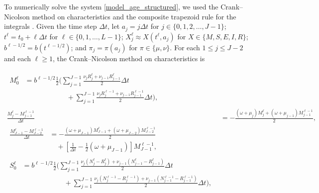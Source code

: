 \documentclass{jpmarticle}
\let\subequationsorig\subequations%
\let\endsubequationsorig\endsubequations%
\renewenvironment{subequations}{
  \subequationsorig
  \renewcommand{\theequation}{\theparentequation.\arabic{equation}}
}{
  \endsubequationsorig
}
\begin{document}
To numerically solve the system \eqref{model_age_structured}, we used
the Crank--Nicolson method on characteristics and the composite
trapezoid rule for the integrals \autocite{milner_1992}.  Given the
time step $\Delta t$, let
$a_j = j \Delta t$ for $j \in \{0, 1, 2, \ldots, J - 1\}$;
$t^{\ell} = t_0 + \ell \Delta t$ for $\ell \in \{0, 1, \ldots, L - 1\}$;
$X_j^{\ell} \approx X(t^{\ell}, a_j)$ for $X \in \{M, S, E, I, R\}$;
$b^{\ell - 1 / 2} = b(t^{\ell - 1 / 2})$; and
$\pi_j = \pi(a_j)$ for $\pi \in \{\mu, \nu\}$.
For each $1 \leq j \leq J - 2$ and each $\ell \geq 1$, the
Crank--Nicolson method on characteristics is
\begin{subequations}
  \begin{align}
    \begin{split}
      M_0^{\ell} &=
      b^{\ell - 1 / 2}
      \frac{1}{2}
      \Bigg(
      \sum_{j = 1}^{J - 1}
      \frac{\nu_j R_j^{\ell} + \nu_{j - 1} R_{j - 1}^{\ell}}{2}
      \Delta t
      \\ & \quad\quad\quad\quad\quad\quad {}
      + \sum_{j = 1}^{J - 1}
      \frac{\nu_j R_j^{\ell - 1} + \nu_{j - 1} R_{j - 1}^{\ell - 1}}{2}
      \Delta t
      \Bigg),
    \end{split}
    \\
    \frac{M_j^{\ell} - M_{j - 1}^{\ell - 1}}{\Delta t} &=
    - \frac{(\omega + \mu_j) M_j^{\ell}
      + (\omega + \mu_{j - 1}) M_{j - 1}^{\ell - 1}}{2},
    \\
    \begin{split}
      \frac{M_{J - 1}^{\ell} - M_{J - 2}^{\ell - 1}}{\Delta t} &=
      - \frac{(\omega + \mu_{J - 1}) M_{J - 1}^{\ell}
        + (\omega + \mu_{J - 2}) M_{J - 2}^{\ell - 1}}{2}
      \\ & \quad {}
      + \left[\frac{1}{\Delta t}
        - \frac{1}{2} (\omega + \mu_{J - 1})\right]
      M_{J - 1}^{\ell - 1},
    \end{split}
    \\
    \begin{split}
      S_0^{\ell} &=
      b^{\ell - 1 / 2}
      \frac{1}{2}
      \Bigg(
      \sum_{j = 1}^{J - 1}
      \frac{\nu_j (N_j^{\ell} - R_j^{\ell})
        + \nu_{j - 1} (N_{j - 1}^{\ell} - R_{j - 1}^{\ell})}
      {2}
      \Delta t
      \\ & \quad\quad\quad\quad\quad\quad {}
      + \sum_{j = 1}^{J - 1}
      \frac{\nu_j (N_j^{\ell - 1} - R_j^{\ell - 1})
        + \nu_{j - 1} (N_{j - 1}^{\ell - 1} - R_{j - 1}^{\ell - 1})}
      {2}
      \Delta t
      \Bigg),
    \end{split}

\end{align}
\end{subequations}
\end{document}
